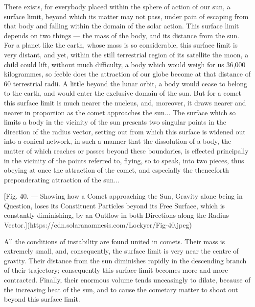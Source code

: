 \documentclass[a4paper, 12pt, oneside, polutonikogreek, english]{article}
\begin{document}
There exists, for everybody placed within the sphere of action of our sun, a surface limit, beyond which its matter may not pass, under pain of escaping from that body and falling within the domain of the solar action. This surface limit depends on two things --- the mass of the body, and its distance from the sun. For a planet like the earth, whose mass is so considerable, this surface limit is very distant, and yet, within the still terrestrial region of its satellite the moon, a child could lift, without much difficulty, a body which would weigh for us 36,000 kilogrammes, so feeble does the attraction of our globe become at that distance of 60 terrestrial radii. A little beyond the lunar orbit, a body would cease to belong to the earth, and would enter the exclusive domain of the sun. But for a comet this surface limit is much nearer the nucleus, and, moreover, it draws nearer and nearer in proportion as the comet approaches the sun... The surface which so limits a body in the vicinity of the sun presents two singular points in the direction of the radius vector, setting out from which this surface is widened out into a conical network, in such a manner that the dissolution of a body, the matter of which reaches or passes beyond these boundaries, is effected principally in the vicinity of the points referred to, flying, so to speak, into two pieces, thus obeying at once the attraction of the comet, and especially the thenceforth preponderating attraction of the sun...

[Fig. 40. --- Showing how a Comet approaching the Sun, Gravity alone being in Question, loses its Constituent Particles beyond its Free Surface, which is constantly diminishing, by an Outflow in both Directions along the Radius Vector.](https://cdn.solaranamnesis.com/Lockyer/Fig-40.jpeg)

All the conditions of instability are found united in comets. Their mass is extremely small, and, consequently, the surface limit is very near the centre of gravity. Their distance from the sun diminishes rapidly in the descending branch of their trajectory; consequently this surface limit becomes more and more contracted. Finally, their enormous volume tends unceasingly to dilate, because of the increasing heat of the sun, and to cause the cometary matter to shoot out beyond this surface limit.
\end{document}
